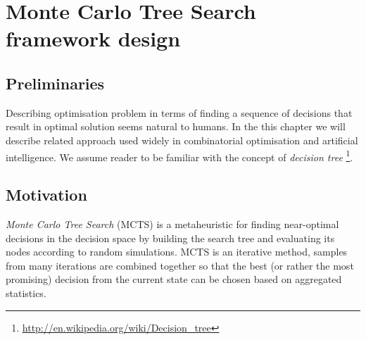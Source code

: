 \chapter{Monte Carlo Tree Search framework design}

\section{Preliminaries}
Describing optimisation problem in terms of finding a sequence of decisions
that result in optimal solution seems natural to humans. In the this chapter we
will describe related approach used widely in combinatorial optimisation and
artificial intelligence. We assume reader to be familiar with the concept of
\emph{decision tree}
\footnote{\url{http://en.wikipedia.org/wiki/Decision_tree}}.

\section{Motivation}
\emph{Monte Carlo Tree Search} (MCTS) is a metaheuristic for finding
near-optimal decisions in the decision space by building the search tree and
evaluating its nodes according to random simulations.
MCTS is an iterative method, samples from many iterations are combined together
so that the best (or rather the most promising) decision from the current state
can be chosen based on aggregated statistics.

